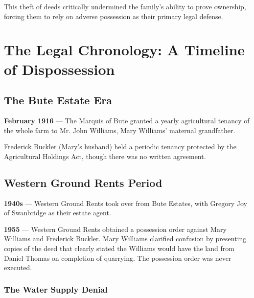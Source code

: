 \documentclass[11pt,a4paper]{article}
\begin{document}
This theft of deeds critically undermined the family's ability to prove ownership, forcing them to rely on adverse possession as their primary legal defense.

\newpage

\section{The Legal Chronology: A Timeline of Dispossession}

\subsection{The Bute Estate Era}

\begin{timeline}
\textbf{February 1916} --- The Marquis of Bute granted a yearly agricultural tenancy of the whole farm to Mr. John Williams, Mary Williams' maternal grandfather.
\end{timeline}

Frederick Buckler (Mary's husband) held a periodic tenancy protected by the Agricultural Holdings Act, though there was no written agreement.

\subsection{Western Ground Rents Period}

\begin{timeline}
\textbf{1940s} --- Western Ground Rents took over from Bute Estates, with Gregory Joy of Swanbridge as their estate agent.
\end{timeline}

\begin{timeline}
\textbf{1955} --- Western Ground Rents obtained a possession order against Mary Williams and Frederick Buckler. Mary Williams clarified confusion by presenting copies of the deed that clearly stated the Williams would have the land from Daniel Thomas on completion of quarrying. The possession order was never executed.
\end{timeline}

\subsubsection{The Water Supply Denial}
\end{document}
